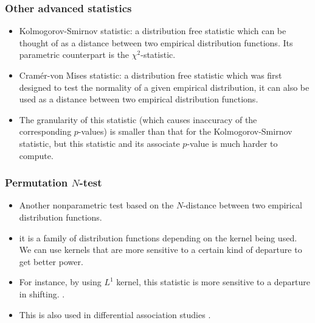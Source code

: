 \begin{frame}
  \frametitle{Other advanced statistics} 
  \begin{itemize}
  \item Kolmogorov-Smirnov statistic: a distribution free statistic
    which can be thought of as a \alert{distance} between two
    empirical distribution functions. Its parametric counterpart is
    the $\chi^2$-statistic.
  \item Cram\'er-von Mises statistic: a distribution free statistic
    which was first designed to test the normality of a given
    empirical distribution, it can also be used as a \alert{distance}
    between two empirical distribution functions.
  \item The granularity of this statistic (which causes inaccuracy of
    the corresponding $p$-values) is smaller than that for the
    Kolmogorov-Smirnov statistic, but this statistic and its associate
    $p$-value is much harder to compute.
    \cite{Xiao2007C++ProgramCramer-von}
  \end{itemize}
\end{frame}

\begin{frame}
  \frametitle{Permutation $N$-test} 
  \begin{itemize}
  \item Another nonparametric test based on the $N$-distance between
    two empirical distribution functions.
  \item it is a family of distribution functions depending on the
    \alert{kernel} being used. We can use kernels that are more
    sensitive to a certain kind of departure to get better power.
  \item For instance, by using $L^1$ kernel, this statistic is more
    sensitive to a departure in shifting.
    \cite{Klebanov2005permutationtestmotivated}.
  \item This is also used in differential association studies
    \cite{hu08:_detec_inter_correl_chang_in_microar_analy,rui2009b,Needham2011}.
  \end{itemize}
\end{frame}

